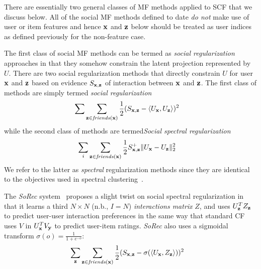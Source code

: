 There are essentially two general classes of MF methods applied to SCF
that we discuss below.  All of the social MF methods defined to date
\emph{do not} make use of user or item features and hence $\mathbf{x}$ and
$\mathbf{z}$ below should be treated as user indices as defined previously for
the non-feature case.

The first class of social MF methods can be termed as \emph{social
regularization} approaches in that they somehow constrain the latent
projection represented by $U$.
There are two social regularization methods that directly constrain
$U$ for user $\mathbf{x}$ and $\mathbf{z}$ based on evidence $S_{\mathbf{x},\mathbf{z}}$ of interaction
between $\mathbf{x}$ and $\mathbf{z}$.  The first class of methods are
simply termed \emph{social regularization}~\cite{lla,socinf} 
\begin{align}
\sum_{} & \sum_{\mathbf{z} \in \mathit{friends}(\mathbf{x})} \frac{1}{2} (S_{\mathbf{x},\mathbf{z}} - \langle U_{\mathbf{x}}, U_{\mathbf{z}} \rangle)^2 \label{eq:simple_sr}
\end{align}
while the second class of methods are termed\emph{Social spectral regularization}~\cite{sr,rrmf}
\begin{align}
\sum_{i} & \sum_{\mathbf{z} \in \mathit{friends}(\mathbf{x})} \frac{1}{2} S^+_{\mathbf{x},\mathbf{z}} \| U_{\mathbf{x}} - U_{\mathbf{z}} \|_2^2 \label{eq:simple_spectral_sr}
\end{align}
We refer to the latter as \emph{spectral} regularization methods since they are
identical to the objectives used in spectral clustering~\cite{spectral}.

The {\it SoRec} system~\cite{sorec} proposes a slight twist on social
spectral regularization in that it learns a third $N \times N$ (n.b., $I = N$)
\emph{interactions matrix} $Z$, and uses $U_{\mathbf{z}}^T Z_{\mathbf{z}}$ to predict user-user
interaction preferences in the same way that standard CF uses $V$ in
$U_{\mathbf{x}}^T V_{\mathbf{y}}$ to predict user-item ratings.  {\it SoRec} also uses a
sigmoidal transform $\sigma(o) = \frac{1}{1 + e^{-o}}$:
%
%
\begin{align}
\sum_{\mathbf{z}} & \sum_{\mathbf{z} \in \mathit{friends}(\mathbf{x})} \frac{1}{2} (S_{\mathbf{x},\mathbf{z}} - \sigma(\langle U_{\mathbf{x}}, Z_{\mathbf{z}} \rangle))^2 
\end{align}

